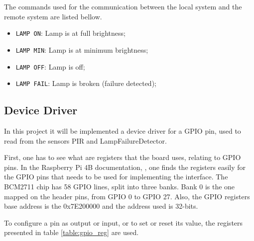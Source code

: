 The commands used for the communication between the local system and the remote system are listed bellow.
\begin{itemize}
	\item \verb|LAMP ON|: Lamp is at full brightness;
	\item \verb|LAMP MIN|: Lamp is at minimum brightness;
	\item \verb|LAMP OFF|: Lamp is off;
	\item \verb|LAMP FAIL|: Lamp is broken (failure detected);
\end{itemize}

\clearpage
\subsection{Device Driver}
In this project it will be implemented a device driver for a GPIO pin, used to read from the sensors PIR and LampFailureDetector.

First, one has to see what are registers that the board uses, relating to GPIO pins. In the Raspberry Pi 4B documentation, \cite{rpi_datasheet}, one finds the registers easily for the GPIO pins that needs to be used for implementing the interface. The BCM2711 chip has 58 GPIO lines, split into three banks. Bank 0 is the one mapped on the header pins, from GPIO 0 to GPIO 27. Also, the GPIO registers base address is the 0x7E200000 and the address used is 32-bits.

To configure a pin as output or input, or to set or reset its value, the registers presented in table \ref{table:gpio_reg} are used.

